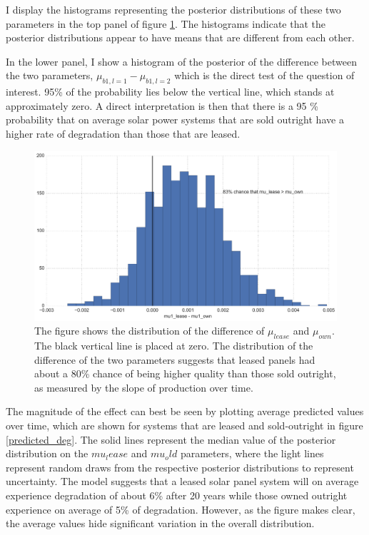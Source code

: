 \documentclass[12pt]{article}
\begin{document}
I display the histograms representing the posterior distributions of these two parameters in the top panel of figure \ref{diff_lease}. The histograms indicate that the posterior distributions appear to have means that are different from each other.

In the lower panel, I show a histogram of the posterior of the difference between the two parameters, $\mu_{b1,l=1} - \mu_{b1,l=2} $ which is the direct test of the question of interest. 95\% of the probability lies below the vertical line, which stands at approximately zero. A direct interpretation is then that there is a 95 \% probability that on average solar power systems that are sold outright have a higher rate of degradation than those that are leased.

\begin{figure}
	\includegraphics[width=1\textwidth]{figures/diff_lease.png}
	\caption{The figure shows the distribution of the difference of $\mu_{lease}$ and $\mu_{own} $. The black vertical line is placed at zero. The distribution of the difference of the two parameters suggests that leased panels had about a 80\% chance of being higher quality than those sold outright, as measured by the slope of production over time.}
	\label{diff_lease}
\end{figure}

The magnitude of the effect can best be seen by plotting average predicted values over time, which are shown for systems that are leased and sold-outright in figure \ref{predicted_deg}. The solid lines represent the median value of the posterior distribution on the $mu_lease$ and $mu_old$ parameters, where the light lines represent random draws from the respective posterior distributions to represent uncertainty. The model suggests that a leased solar panel system will on average experience degradation of about 6\% after 20 years while those owned outright experience on average of 5\% of degradation. However, as the figure makes clear, the average values hide significant variation in the overall distribution.
\end{document}
